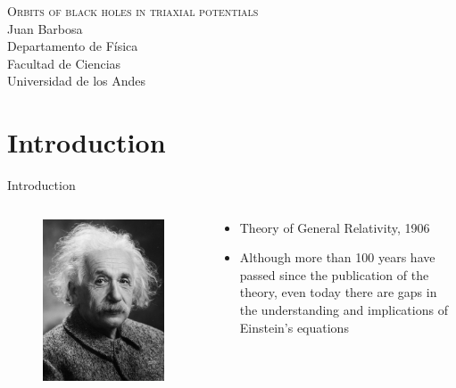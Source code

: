 \documentclass{beamer}
\begin{document}
\begin{frame}
	\centering
	\textsc{\LARGE Orbits of black holes in triaxial potentials}
	\\
	\vspace{2.5cm}
	Juan Barbosa\\
	\vspace{1cm}
	\footnotesize
	Departamento de F\'isica\\
	Facultad de Ciencias\\
	Universidad de los Andes
\end{frame}

\section{Introduction}
\begin{frame}{Introduction}
	\begin{columns}
		\begin{column}{0.5\textwidth}
			\begin{figure}[h]
				\centering
				\includegraphics[width=0.9\linewidth]{images/Albert_Einstein_Head}
			\end{figure}
		\end{column}
		\begin{column}{0.5\textwidth}
			\begin{itemize}
				\item Theory of General Relativity, 1906
				\item Although more than 100 years have passed since the publication of the theory, even today there are gaps in the understanding and implications of Einstein's equations
			\end{itemize}
		\end{column}
	\end{columns}
\end{frame}
\end{document}
